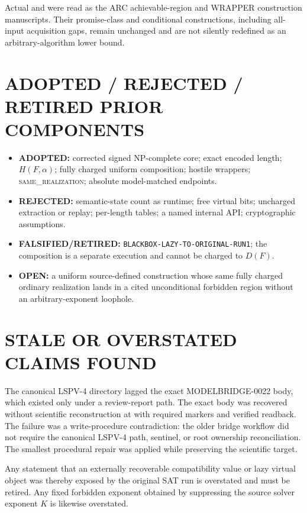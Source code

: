 \documentclass[11pt]{article}
\newcommand{\same}{\textsc{same\_realization}}
\begin{document}
Actual  and  were read as the ARC
achievable-region and WRAPPER construction manuscripts.  Their promise-class
and conditional constructions, including all-input acquisition gaps, remain
unchanged and are not silently redefined as an arbitrary-algorithm lower
bound.

\section{ADOPTED / REJECTED / RETIRED PRIOR COMPONENTS}
\begin{itemize}[leftmargin=*]
\item \textbf{ADOPTED:} corrected signed NP-complete core; exact encoded
length; \(H(F,\alpha)\); fully charged uniform composition; hostile wrappers;
\same{}; absolute model-matched endpoints.
\item \textbf{REJECTED:} semantic-state count as runtime; free virtual bits;
uncharged extraction or replay; per-length tables; a named internal API;
cryptographic assumptions.
\item \textbf{FALSIFIED/RETIRED:}
\texttt{BLACKBOX-LAZY-TO-ORIGINAL-RUN1}; the composition is a separate
execution and cannot be charged to \(D(F)\).
\item \textbf{OPEN:} a uniform source-defined construction whose same fully
charged ordinary realization lands in a cited unconditional forbidden region
without an arbitrary-exponent loophole.
\end{itemize}

\section{STALE OR OVERSTATED CLAIMS FOUND}
The canonical LSPV-4 directory lagged the exact MODELBRIDGE-0022 body, which
existed only under a review-report path.  The exact body was recovered without
scientific reconstruction at
with required markers and verified readback.  The failure was a write-procedure
contradiction: the older bridge workflow did not require the canonical LSPV-4
path, sentinel, or root ownership reconciliation.  The smallest procedural
repair was applied while preserving the scientific target.

Any statement that an externally recoverable compatibility value or lazy
virtual object was thereby exposed by the original SAT run is overstated and
must be retired.  Any fixed forbidden exponent obtained by suppressing the
source solver exponent \(K\) is likewise overstated.
\end{document}
